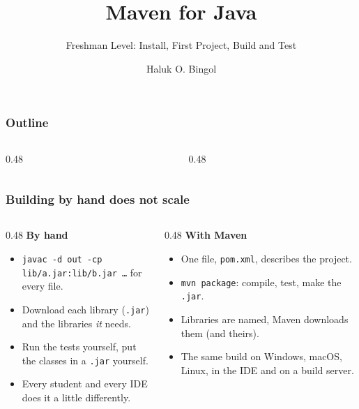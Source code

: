 \documentclass[aspectratio=169,10pt,compress]{beamer}
\title{Maven for Java}
\subtitle{Freshman Level: Install, First Project, Build and Test}
\author[Bingol]{Haluk O. Bingol}
\institute[FCIS]{
    Faculty of Computer and Information Sciences\\
    Yeditepe University
}
\date{
	{\tiny \hbTimeStamp}
}
\begin{document}
\begin{frame}[t,fragile]
  \titlepage
\end{frame}




\begin{frame}[t,fragile] \frametitle{Outline}
  \begin{columns}[T]
    \begin{column}{0.48\textwidth}
      \tableofcontents[sections={1-4}, hideallsubsections]
    \end{column}
    \begin{column}{0.48\textwidth}
      \tableofcontents[sections={5-7}, hideallsubsections]
    \end{column}
  \end{columns}
\end{frame}





\begin{frame}[t,fragile] \frametitle{Building by hand does not scale}
  \begin{columns}[T]
    \begin{column}{0.48\textwidth}
      \textbf{By hand}
      \begin{itemize}\small
        \item \texttt{javac -d out -cp lib/a.jar:lib/b.jar \dots} for every file.
        \item Download each library (\texttt{.jar}) and the libraries \emph{it} needs.
        \item Run the tests yourself, put the classes in a \texttt{.jar} yourself.
        \item Every student and every IDE does it a little differently.
      \end{itemize}
    \end{column}
    \begin{column}{0.48\textwidth}
      \textbf{With Maven}
      \begin{itemize}\small
        \item One file, \texttt{pom.xml}, describes the project.
        \item \texttt{mvn package}: compile, test, make the \texttt{.jar}.
        \item Libraries are named, Maven downloads them (and theirs).
        \item The same build on Windows, macOS, Linux, in the IDE and on a build server.
      \end{itemize}
    \end{column}
  \end{columns}
  \vspace{0.5em}
\end{frame}
\end{document}
